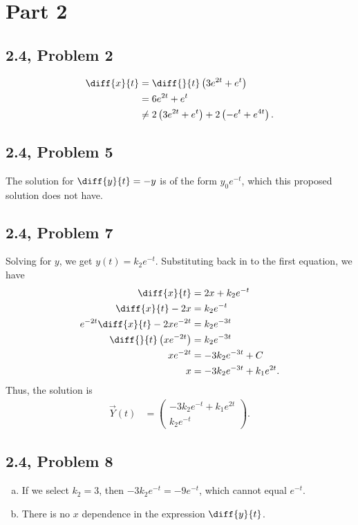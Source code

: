 \documentclass[10pt]{mypackage}
\begin{document}
\section{Part 2}%
\subsection{2.4, Problem 2}%
\begin{align*}
  \diff{x}{t} &= \diff{}{t}\left(3e^{2t} + e^{t}\right)\\
              &= 6e^{2t} + e^{t}\\
              &\neq 2\left(3e^{2t} + e^{t}\right) + 2\left(-e^{t} + e^{4t}\right).
\end{align*}
\subsection{2.4, Problem 5}%
The solution for $\diff{y}{t} = -y$ is of the form $y_0e^{-t}$, which this proposed solution does not have.
\subsection{2.4, Problem 7}%
Solving for $y$, we get $y(t) = k_2e^{-t}$. Substituting back in to the first equation, we have
\begin{align*}
  \diff{x}{t} &= 2x + k_2e^{-t}\\
  \diff{x}{t} - 2x &= k_2e^{-t}\\
  e^{-2t}\diff{x}{t} - 2xe^{-2t} &= k_2e^{-3t}\\
  \diff{}{t}\left(xe^{-2t}\right) &= k_2e^{-3t}\\
  xe^{-2t} &= -3k_2e^{-3t} + C\\
  x &= -3k_2e^{-3t} + k_1e^{2t}.
\end{align*}
Thus, the solution is
\begin{align*}
  \vec{Y}(t) &= \begin{pmatrix}-3k_2e^{-t} + k_1e^{2t}\\k_2e^{-t}\end{pmatrix}.
\end{align*}
\subsection{2.4, Problem 8}%
\begin{enumerate}[(a)]
  \item If we select $k_2 = 3$, then $-3k_2e^{-t} = -9e^{-t}$, which cannot equal $e^{-t}$.
  \item There is no $x$ dependence in the expression $\diff{y}{t}$.
\end{enumerate}
\end{document}
